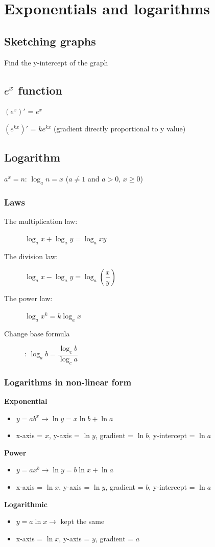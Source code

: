 \documentclass[A4paper]{article}
\begin{document}
	\section{Exponentials and logarithms}
	\subsection{Sketching graphs}
	Find the y-intercept of the graph

	\subsection{$e^x$ function}
	\begin{description}
		\item $(e^x)'$ = $e^x$
		\item $(e^{kx})'$ = $ke^{kx}$ (gradient directly proportional to y value)
	\end{description}

	\subsection{Logarithm}
	$a^x = n$: $\log_a n = x$ ($a\neq1$ and $a>0$, $x\geq0$)
	\subsubsection{Laws}
	\begin{description}
		\item[The multiplication law:] $\log_a x + \log_a y = \log_a xy$
		\item[The division law:] $\log_a x - \log_a y = \log_a (\dfrac{x}{y})$
		\item[The power law:] $\log_a x^k = k\log_a x$
		\item[Change base formula]: $\log_a b = \dfrac{\log_c b}{\log_c a}$
	\end{description}

	\subsubsection{Logarithms in non-linear form}
	\textbf{Exponential}
	\begin{itemize}
		\item $y=ab^x\rightarrow\ln y = x\ln b + \ln a$
		\item x-axis = $x$, y-axis = $\ln y$, gradient = $\ln b$, y-intercept = $\ln a$
	\end{itemize}
	\textbf{Power}
	\begin{itemize}
		\item $y=ax^b\rightarrow\ln y = b\ln x + \ln a$
		\item x-axis = $\ln x$, y-axis = $\ln y$, gradient = $b$, y-intercept = $\ln a$
	\end{itemize}
	\textbf{Logarithmic}
	\begin{itemize}
		\item $y=a\ln x\rightarrow$ kept the same
		\item x-axis = $\ln x$, y-axis = $y$, gradient = $a$
	\end{itemize}
\end{document}
